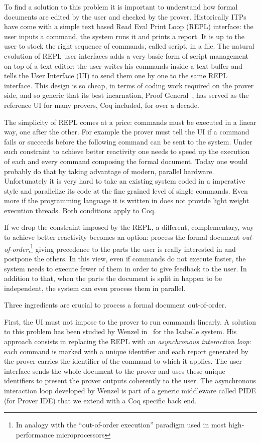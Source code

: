 \documentclass[runningheads,a4paper,oribibl]{llncs}
\begin{document}
To find a solution to this problem it is important to understand how
formal documents are edited by the user and checked by the prover.
Historically ITPs have come with a simple text based Read Eval Print
Loop (REPL) interface: the user inputs a command, the system runs it
and prints a report.  It is up to the user to stock the right sequence
of commands, called script, in a file. The natural evolution
of REPL user interfaces adds a very basic form of script
management on top of a text editor: the user writes his commands
inside a text buffer and tells the User Interface (UI) to send them one by
one to the same REPL interface.  This
design %
is so cheap, in terms of
coding work required on the prover side, and so generic that its best
incarnation, Proof General~{\cite{DBLP:conf/tacas/Aspinall00}}, has
served as the reference UI for many provers, Coq included, for over a
decade.

The simplicity of REPL comes at a price: commands must be executed in a linear
way, one after the other. For example the prover must tell the UI if
a command fails or succeeds before the following command can be sent
to the system.  Under such constraint to achieve better reactivity one
needs to speed up the execution of each and every command composing
the formal document.  Today one would probably do that by taking
advantage of modern, parallel hardware.  Unfortunately it is very hard
to take an existing system coded in a imperative style and parallelize
its code at the fine grained level of single commands.  Even more if
the programming language it is written in does not provide light
weight execution threads.  Both conditions apply to Coq.

If we drop the constraint imposed by the REPL, a different,
complementary, way to achieve better reactivity becomes an option:
process the formal document \emph{out-of-order},\footnote{In analogy
with the ``out-of-order execution'' paradigm used in
most high-performance microprocessors} giving precedence to
the parts the user is really interested in and postpone the others.
In this view, even if commands do not execute faster, the system needs
to execute fewer of them in order to give feedback to the user.  In
addition to that, when the parts the document is split in happen to be
independent, the system can even process them in parallel.

Three ingredients are crucial to process a formal document out-of-order.

First, the UI must not impose to the prover to run commands linearly.
A solution to this problem has been studied by Wenzel
in~\cite{DBLP:journals/corr/Wenzel13} for the Isabelle
system. His approach consists in
replacing the REPL with an \emph{asynchronous interaction loop}: each
command is marked with a unique identifier and each report generated
by the prover carries the identifier of the command to which it applies.
The user
interface sends the whole document to the prover and uses these unique
identifiers to 
present the prover outputs coherently to the
user.  The asynchronous interaction loop developed by Wenzel is part
of a generic middleware called PIDE (for Prover IDE) that we extend
with a Coq specific back end.
\end{document}
